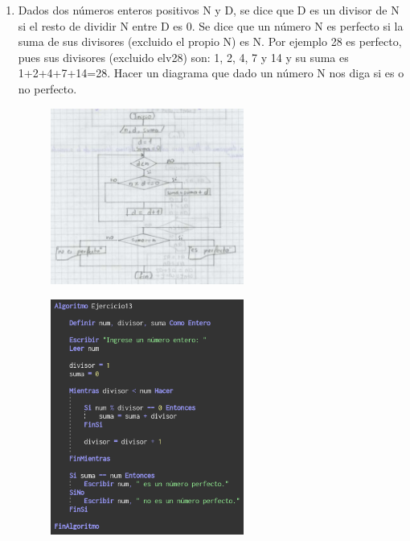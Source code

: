 \documentclass[12pt]{article}
\begin{document}
\begin{enumerate}
        
            \newpage 
            \item Dados dos números enteros positivos N y D, se dice que D es un divisor de N si el resto de dividir N entre D es 0. Se dice que un número N es perfecto si la suma de sus divisores (excluido el propio N) es N. Por ejemplo 28 es perfecto, pues sus divisores (excluido elv28) son: 1, 2, 4, 7 y 14 y su suma es 1+2+4+7+14=28. Hacer un diagrama que dado un número N nos diga si es o no perfecto.
                
                \begin{figure}[!h]
                    \centering
                    \includegraphics[width=0.6\textwidth]{Img/DF_ej13.png}
                \end{figure}

                \newpage
                \begin{figure}[!h]
                    \centering
                    \includegraphics[width=0.6\textwidth]{Img/Cod_ej13.png}
                \end{figure}


\end{enumerate}
\end{document}
